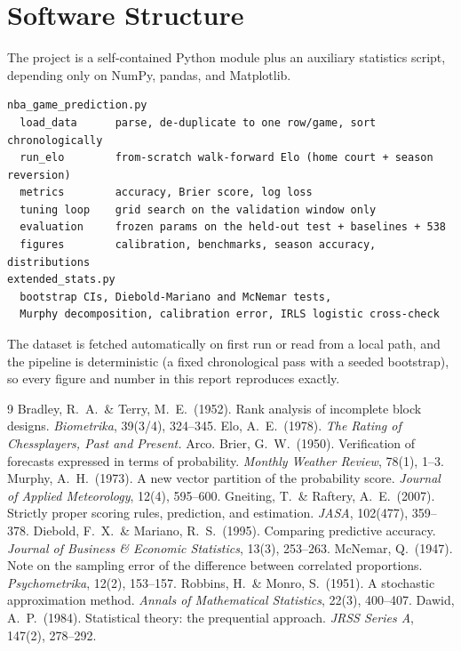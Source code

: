 \documentclass[11pt]{article}
\begin{document}
\section{Software Structure}
The project is a self-contained Python module plus an auxiliary statistics script,
depending only on NumPy, pandas, and Matplotlib.
\begin{verbatim}
nba_game_prediction.py
  load_data      parse, de-duplicate to one row/game, sort chronologically
  run_elo        from-scratch walk-forward Elo (home court + season reversion)
  metrics        accuracy, Brier score, log loss
  tuning loop    grid search on the validation window only
  evaluation     frozen params on the held-out test + baselines + 538
  figures        calibration, benchmarks, season accuracy, distributions
extended_stats.py
  bootstrap CIs, Diebold-Mariano and McNemar tests,
  Murphy decomposition, calibration error, IRLS logistic cross-check
\end{verbatim}
The dataset is fetched automatically on first run or read from a local path, and
the pipeline is deterministic (a fixed chronological pass with a seeded bootstrap),
so every figure and number in this report reproduces exactly.

\begin{thebibliography}{9}
 Bradley, R.\ A.\ \& Terry, M.\ E.\ (1952). Rank analysis of
incomplete block designs. \textit{Biometrika}, 39(3/4), 324--345.
 Elo, A.\ E.\ (1978). \textit{The Rating of Chessplayers, Past and
Present.} Arco.
 Brier, G.\ W.\ (1950). Verification of forecasts expressed in
terms of probability. \textit{Monthly Weather Review}, 78(1), 1--3.
 Murphy, A.\ H.\ (1973). A new vector partition of the
probability score. \textit{Journal of Applied Meteorology}, 12(4), 595--600.
 Gneiting, T.\ \& Raftery, A.\ E.\ (2007). Strictly proper
scoring rules, prediction, and estimation. \textit{JASA}, 102(477), 359--378.
 Diebold, F.\ X.\ \& Mariano, R.\ S.\ (1995). Comparing predictive
accuracy. \textit{Journal of Business \& Economic Statistics}, 13(3), 253--263.
 McNemar, Q.\ (1947). Note on the sampling error of the
difference between correlated proportions. \textit{Psychometrika}, 12(2),
153--157.
 Robbins, H.\ \& Monro, S.\ (1951). A stochastic approximation
method. \textit{Annals of Mathematical Statistics}, 22(3), 400--407.
 Dawid, A.\ P.\ (1984). Statistical theory: the prequential
approach. \textit{JRSS Series A}, 147(2), 278--292.
\end{thebibliography}
\end{document}
